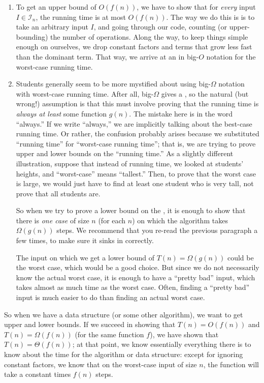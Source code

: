 \begin{enumerate}
\item To get an upper bound of $O(f(n))$, we have to show that for
\emph{every} input $I \in \mathcal{I}_n$, the running time is at most
$O(f(n))$.
The way we do this is is to take an arbitrary input $I$, 
and going through our code, counting (or upper-bounding) the number
of operations.
Along the way, to keep things simple enough on ourselves,
we drop constant factors and terms that grow less fast than
the dominant term. That way, we arrive at an  in
big-$O$ notation for the worst-case running time.

\item Students generally seem to be more mystified about using big-$\Omega$
notation with worst-case running time. After all, big-$\Omega$ gives a
, so the natural (but wrong!) assumption is that
this must involve proving that the running time is \emph{always at
  least} some function $g(n)$. The mistake here is in the word
``always.''
If we write ``always,'' we are implicitly talking about the best-case
running time.
Or rather, the confusion probably arises because we substituted
``running time'' for ``worst-case running time'';
that is, we are trying to prove upper and lower bounds on the
``running time.''
As a slightly different illustration, suppose that instead of running
time, we looked at students' heights, and ``worst-case'' means
``tallest.'' Then, to prove that the worst case is large, we would just
have to find at least one student who is very tall, not prove that all
students are.

So when we try to prove a lower bound on the 
, 
it is enough to show that there is \emph{one case} of size
$n$ (for each $n$) on which the algorithm takes $\Omega(g(n))$ steps.
We recommend that you re-read the previous paragraph a few times, to
make sure it sinks in correctly.

The input on which we get a lower bound of $T(n) = \Omega(g(n))$ could
be the worst case, which would be a good choice. But since we do not
necessarily know the actual worst case, it is enough to have a ``pretty
bad'' input, which takes almost as much time as the worst case.
Often, finding a ``pretty bad'' input is much easier to do than
finding an actual worst case.
\end{enumerate}

So when we have a data structure (or some other algorithm),
we want to get upper and lower bounds.
If we succeed in showing that $T(n) = O(f(n))$ and 
$T(n) = \Omega(f(n))$ (for the same function $f$), we have shown that
$T(n) = \Theta(f(n))$; at that point, we know essentially everything
there is to know about the time for the algorithm or data structure:
except for ignoring constant factors, we know that on the worst-case
input of size $n$, the function will take a constant times $f(n)$
steps.


